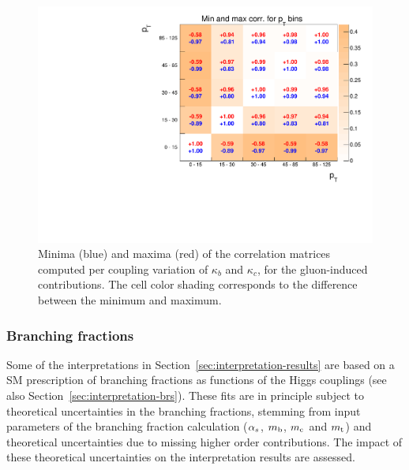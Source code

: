 \begin{figure}[hbtp]
  \begin{center}
    \includegraphics[width=\halflinewidth]{img/interpretation/other/minmax_corrMat_exp.pdf}
    \caption{
        Minima (blue) and maxima (red) of the correlation matrices computed per coupling variation of $\kappa_b$ and $\kappa_c$, for the gluon-induced contributions.
        The cell color shading corresponds to the difference between the minimum and maximum.
        }
    \label{fig:corrmat-minmax}
  \end{center}
\end{figure}




\subsubsection{Branching fractions}

Some of the interpretations in Section~\ref{sec:interpretation-results} are based on a SM prescription of branching fractions as functions of the Higgs couplings (see also Section~\ref{sec:interpretation-brs}).
% 
These fits are in principle subject to theoretical uncertainties in the branching fractions, stemming from input parameters of the branching fraction calculation ($\alpha_s$, $m_{\mathrm{b}}$, $m_{\mathrm{c}}$ and $m_{\mathrm{t}}$) and theoretical uncertainties due to missing higher order contributions.
% 
The impact of these theoretical uncertainties on the interpretation results are assessed.


